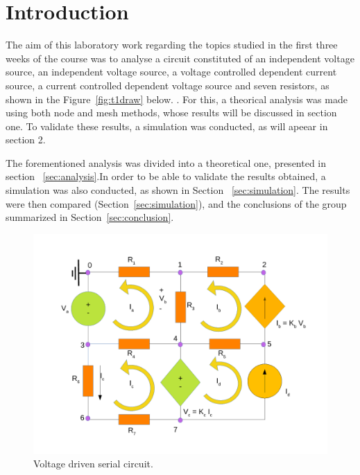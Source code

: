 \section{Introduction}
\label{sec:introduction}

The aim of this laboratory work regarding the topics studied in the first three weeks of the course was to analyse a circuit constituted of an independent voltage source, an independent voltage source, a voltage controlled dependent current source, a current controlled dependent voltage source and seven resistors, as shown in the Figure~\ref{fig:t1draw} below.
. For this, a theorical analysis was made using both node and mesh methods, whose results will be discussed in section one. To validate these results, a simulation was conducted, as will apeear in section 2.

\lipsum[1-1]

The forementioned analysis was divided into a theoretical one, presented in section ~\ref{sec:analysis}.In order to be able to validate the results obtained, a simulation was also conducted, as shown in Section ~\ref{sec:simulation}. The results were then compared (Section~\ref{sec:simulation}), and the conclusions of the group summarized in Section~\ref{sec:conclusion}.


\begin{figure}[h] \centering
\includegraphics[width=0.4\linewidth]{t1draw.pdf}
\caption{Voltage driven serial circuit.}
\label{fig:circuit}
\end{figure}

